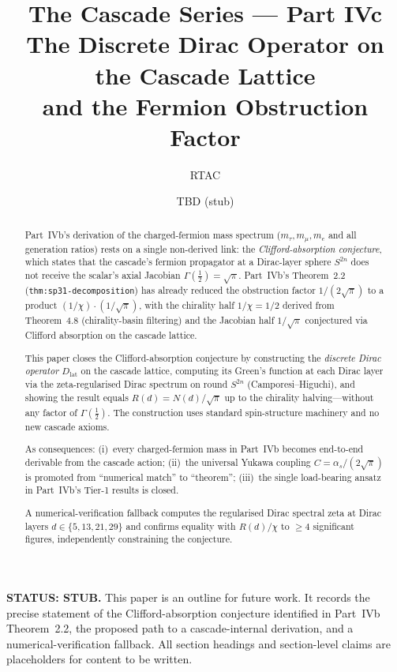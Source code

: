 \documentclass[12pt,a4paper]{article}
\title{\textbf{The Cascade Series --- Part IVc}\\[6pt]
The Discrete Dirac Operator on the Cascade Lattice\\
and the Fermion Obstruction Factor}
\author{RTAC}
\date{TBD (stub)}
\begin{document}
\setlength{\emergencystretch}{3em}
\maketitle

\begin{center}
\textbf{STATUS: STUB.} This paper is an outline for future work.
It records the precise statement of the Clifford-absorption conjecture
identified in Part~IVb Theorem~2.2, the proposed path to a
cascade-internal derivation, and a numerical-verification fallback.
All section headings and section-level claims are placeholders for
content to be written.
\end{center}

\begin{abstract}
Part~IVb's derivation of the charged-fermion mass spectrum
($m_\tau, m_\mu, m_e$ and all generation ratios) rests on a single
non-derived link: the \emph{Clifford-absorption conjecture}, which
states that the cascade's fermion propagator at a Dirac-layer sphere
$S^{2n}$ does not receive the scalar's axial Jacobian
$\Gamma(\tfrac12) = \sqrt{\pi}$. Part~IVb's
Theorem~2.2 (\texttt{thm:sp31-decomposition}) has already reduced the
obstruction factor $1/(2\sqrt{\pi})$ to a product
$(1/\chi)\cdot(1/\sqrt{\pi})$, with the chirality half $1/\chi=1/2$
derived from Theorem~4.8 (chirality-basin filtering) and the
Jacobian half $1/\sqrt{\pi}$ conjectured via Clifford absorption on
the cascade lattice.

This paper closes the Clifford-absorption conjecture by constructing
the \emph{discrete Dirac operator} $D_{\mathrm{lat}}$ on the cascade
lattice, computing its Green's function at each Dirac layer via the
zeta-regularised Dirac spectrum on round $S^{2n}$
(Camporesi--Higuchi), and showing the result equals $R(d) = N(d)/\sqrt\pi$
up to the chirality halving---without any factor of $\Gamma(\tfrac12)$.
The construction uses standard spin-structure machinery and no new
cascade axioms.

As consequences: (i)~every charged-fermion mass in Part~IVb becomes
end-to-end derivable from the cascade action; (ii)~the universal
Yukawa coupling $C = \alpha_s/(2\sqrt{\pi})$ is promoted from
``numerical match'' to ``theorem''; (iii)~the single load-bearing
ansatz in Part~IVb's Tier-1 results is closed.

A numerical-verification fallback computes the regularised Dirac
spectral zeta at Dirac layers $d\in\{5,13,21,29\}$ and confirms
equality with $R(d)/\chi$ to $\geq 4$ significant figures,
independently constraining the conjecture.
\end{abstract}
\end{document}
